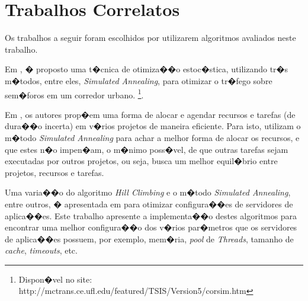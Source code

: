 \documentclass[12pt]{article}
\begin{document}



\section{Trabalhos Correlatos}

Os trabalhos a seguir foram escolhidos por utilizarem algoritmos avaliados neste trabalho.

Em \cite{yun06wsc}, � proposto uma t�cnica de otimiza��o estoc�stica, utilizando tr�s m�todos, entre eles, \textit{Simulated Annealing}, para otimizar o tr�fego sobre sem�foros em um corredor urbano. \footnote{Dispon�vel no site: http://mctrans.ce.ufl.edu/featured/TSIS/Version5/corsim.htm}.

Em \cite{vaziri05wsc}, os autores prop�em uma forma de alocar e agendar recursos e tarefas (de dura��o incerta) em v�rios projetos de maneira eficiente. Para isto, utilizam o m�todo \textit{Simulated Annealing} para achar a melhor forma de alocar os recursos, e que estes n�o impen�am, o m�nimo poss�vel, de que outras tarefas sejam executadas por outros projetos, ou seja, busca um melhor equil�brio entre projetos, recursos e tarefas.

Uma varia��o do algoritmo \textit{Hill Climbing} e o m�todo \textit{Simulated Annealing}, entre outros, � apresentada em \cite{bowei04www} para otimizar configura��es de servidores de aplica��es. Este trabalho apresente a implementa��o destes algoritmos para encontrar uma melhor configura��o dos v�rios par�metros que os servidores de aplica��es possuem, por exemplo, mem�ria, \textit{pool} de \textit{Threads}, tamanho de \textit{cache}, \textit{timeouts}, etc.
\end{document}
